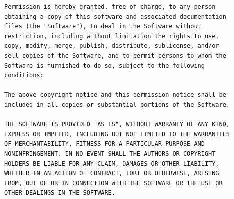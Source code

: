 \documentclass[12pt,a4paper,twoside,openright]{book}
\begin{document}
\begin{verbatim}
Permission is hereby granted, free of charge, to any person
obtaining a copy of this software and associated documentation
files (the "Software"), to deal in the Software without
restriction, including without limitation the rights to use,
copy, modify, merge, publish, distribute, sublicense, and/or
sell copies of the Software, and to permit persons to whom the
Software is furnished to do so, subject to the following
conditions:

The above copyright notice and this permission notice shall be
included in all copies or substantial portions of the Software.

THE SOFTWARE IS PROVIDED "AS IS", WITHOUT WARRANTY OF ANY KIND,
EXPRESS OR IMPLIED, INCLUDING BUT NOT LIMITED TO THE WARRANTIES
OF MERCHANTABILITY, FITNESS FOR A PARTICULAR PURPOSE AND
NONINFRINGEMENT. IN NO EVENT SHALL THE AUTHORS OR COPYRIGHT
HOLDERS BE LIABLE FOR ANY CLAIM, DAMAGES OR OTHER LIABILITY,
WHETHER IN AN ACTION OF CONTRACT, TORT OR OTHERWISE, ARISING
FROM, OUT OF OR IN CONNECTION WITH THE SOFTWARE OR THE USE OR
OTHER DEALINGS IN THE SOFTWARE.
\end{verbatim}

\cleardoublepage
\pagestyle{INDEX}
\printindex[idx]
\end{document}
